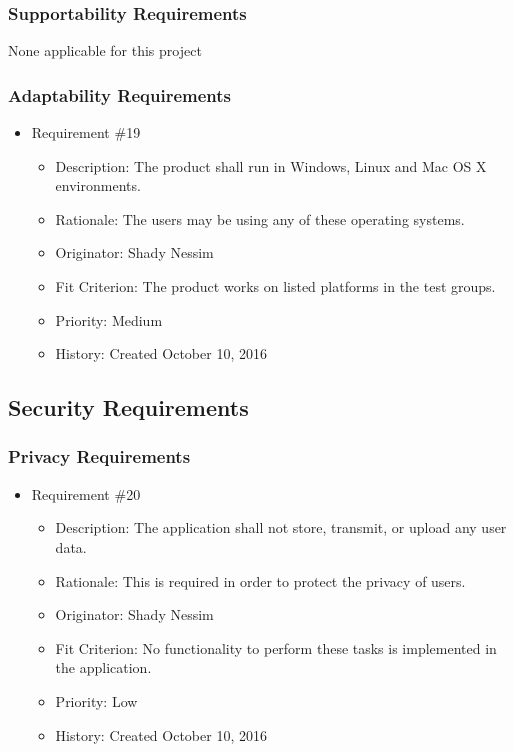 \documentclass[12pt, titlepage]{article}
\begin{document}
\subsubsection{Supportability Requirements}
None applicable for this project

\subsubsection{Adaptability Requirements}
\begin{itemize} 

\item Requirement \#19
\begin{itemize} 
\item Description: The product shall run in Windows, Linux and Mac OS X environments.
\item Rationale: The users may be using any of these operating systems.
\item Originator: Shady Nessim 
\item Fit Criterion: The product works on listed platforms in the test groups.
\item Priority: Medium 
\item History: Created October 10, 2016
\end{itemize}

\end{itemize}

\subsection{Security Requirements}
\subsubsection{Privacy Requirements}
\begin{itemize} 

\item Requirement \#20
\begin{itemize} 
\item Description: The application shall not store, transmit, or upload any user data.
\item Rationale: This is required in order to protect the privacy of users.
\item Originator: Shady Nessim
\item Fit Criterion: No functionality to perform these tasks is implemented in the application. 
\item Priority: Low 
\item History: Created October 10, 2016
\end{itemize}

\end{itemize}
\end{document}
